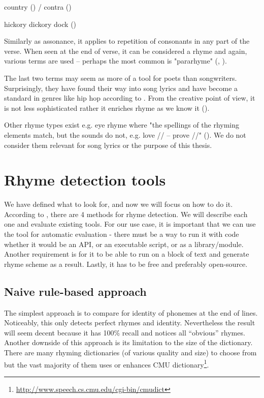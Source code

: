country () / contra ()

hickory dickory dock ()

\noindent Similarly as assonance, it applies to repetition of consonants in any part of the verse. When seen at the end of verse, it can be considered a rhyme and again, various terms are used -- perhaps the most common is "pararhyme" (\cite{britannica}, \cite{oxforddict2008literary}).
\newline

The last two terms may seem as more of a tool for poets than songwriters. Surprisingly, they have found their way into song lyrics and have become a standard in genres like hip hop according to \cite{vanphonological}. From the creative point of view, it is not less sophisticated rather it enriches rhyme as we know it (\cite{brogan2016poeticterms}).


Other rhyme types exist e.g. eye rhyme where "the spellings of the rhyming elements match, but the sounds do not, e.g. love // -- prove //" (\cite{oxforddict2008literary}). We do not consider them relevant for song lyrics or the purpose of this thesis.



\section{Rhyme detection tools}\label{rhyme_detection_tools}
We have defined what to look for, and now we will focus on how to do it. According to \cite{plechac2017presentation}, there are 4 methods for rhyme detection. We will describe each one and evaluate existing tools. For our use case, it is important that we can use the tool for automatic evaluation - there must be a way to run it with code whether it would be an API, or an executable script, or as a library/module. Another requirement is for it to be able to run on a block of text and generate rhyme scheme as a result. Lastly, it has to be free and preferably open-source.

\subsection{Naive rule-based approach} 
The simplest approach is to compare for identity of phonemes at the end of lines. Noticeably,  this only detects perfect rhymes and identity. Nevertheless the result will seem decent because it has 100\% recall and notices all ``obvious'' rhymes. Another downside of this approach is its limitation to the size of the dictionary. There are many rhyming dictionaries (of various quality and size) to choose from but the vast majority of them uses or enhances CMU dictionary\footnote{\url{http://www.speech.cs.cmu.edu/cgi-bin/cmudict}}. 
